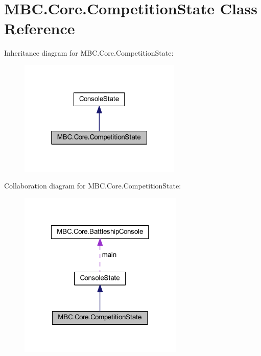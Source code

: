 \hypertarget{class_m_b_c_1_1_core_1_1_competition_state}{\section{M\-B\-C.\-Core.\-Competition\-State Class Reference}
\label{class_m_b_c_1_1_core_1_1_competition_state}
}


Inheritance diagram for M\-B\-C.\-Core.\-Competition\-State\-:\nopagebreak
\begin{figure}[H]
\begin{center}
\leavevmode
\includegraphics[width=220pt]{class_m_b_c_1_1_core_1_1_competition_state__inherit__graph}
\end{center}
\end{figure}


Collaboration diagram for M\-B\-C.\-Core.\-Competition\-State\-:\nopagebreak
\begin{figure}[H]
\begin{center}
\leavevmode
\includegraphics[width=222pt]{class_m_b_c_1_1_core_1_1_competition_state__coll__graph}
\end{center}
\end{figure}
